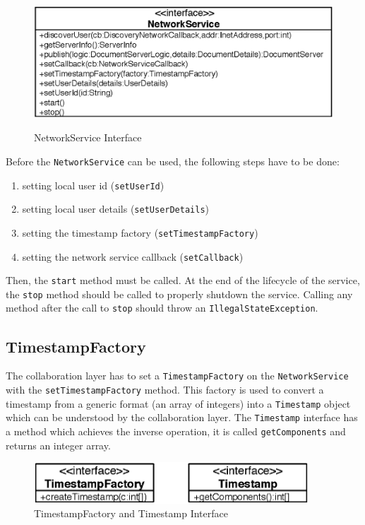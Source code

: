 \begin{figure}[H]
 \centering
 \includegraphics[width=13.19cm,height=4.94cm]{../images/finalreport/architecture_networkservice_uml.eps}
 \caption{NetworkService Interface}
 \label{fig:archoverview.networkservice}
\end{figure}

Before the \texttt{Network\-Service} can be used, the following steps have
to be done:

\begin{enumerate}
 \item setting local user id (\texttt{set\-User\-Id})
 \item setting local user details (\texttt{set\-User\-Details})
 \item setting the timestamp factory (\texttt{set\-Timestamp\-Factory})
 \item setting the network service callback (\texttt{set\-Callback})
\end{enumerate}

Then, the \texttt{start} method must be called. At the end of the lifecycle
of the service, the \texttt{stop} method should be called to properly shutdown
the service. Calling any method after the call to \texttt{stop} should
throw an \texttt{Illegal\-State\-Exception}.


\subsection{TimestampFactory}
The collaboration layer has to set a \texttt{Timestamp\-Factory} on the
\texttt{NetworkService} with the \texttt{set\-Timestamp\-Factory} method. This
factory is used to convert a timestamp from a generic format (an array of
integers) into a \texttt{Timestamp} object which can be understood by the
collaboration layer. The \texttt{Timestamp} interface has a method which 
achieves the inverse operation, it is called \texttt{get\-Components} and
returns an integer array.

\begin{figure}[H]
 \centering
 \includegraphics[width=10.30cm,height=1.55cm]{../images/finalreport/architecture_timestampfactory_uml.eps}
 \caption{TimestampFactory and Timestamp Interface}
\end{figure}


